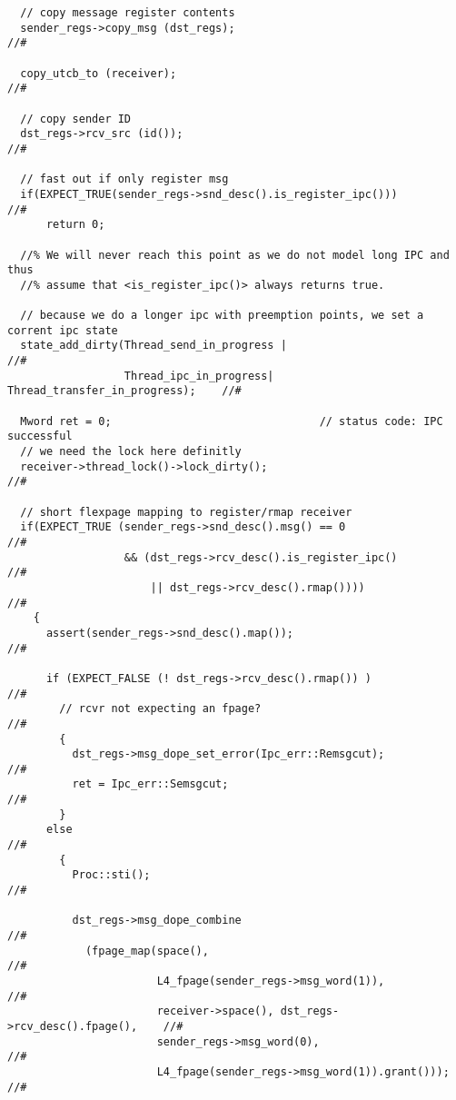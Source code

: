 \begin{lstlisting}
  // copy message register contents
  sender_regs->copy_msg (dst_regs);                                        //# 

  copy_utcb_to (receiver);                                                 //#

  // copy sender ID
  dst_regs->rcv_src (id());                                                //#

  // fast out if only register msg
  if(EXPECT_TRUE(sender_regs->snd_desc().is_register_ipc()))               //#   
      return 0;

  //% We will never reach this point as we do not model long IPC and thus
  //% assume that <is_register_ipc()> always returns true.

  // because we do a longer ipc with preemption points, we set a corrent ipc state
  state_add_dirty(Thread_send_in_progress |                                //#
                  Thread_ipc_in_progress| Thread_transfer_in_progress);    //#

  Mword ret = 0;                                // status code: IPC successful
  // we need the lock here definitly
  receiver->thread_lock()->lock_dirty();                                   //#

  // short flexpage mapping to register/rmap receiver
  if(EXPECT_TRUE (sender_regs->snd_desc().msg() == 0                       //#
                  && (dst_regs->rcv_desc().is_register_ipc()               //#
                      || dst_regs->rcv_desc().rmap())))                    //#
    {
      assert(sender_regs->snd_desc().map());                               //#

      if (EXPECT_FALSE (! dst_regs->rcv_desc().rmap()) )                   //#
        // rcvr not expecting an fpage?                                    //# 
        {
          dst_regs->msg_dope_set_error(Ipc_err::Remsgcut);                 //#
          ret = Ipc_err::Semsgcut;                                         //#
        }
      else                                                                 //#
        {
          Proc::sti();                                                     //#

          dst_regs->msg_dope_combine                                       //#
            (fpage_map(space(),                                            //#
                       L4_fpage(sender_regs->msg_word(1)),                 //#
                       receiver->space(), dst_regs->rcv_desc().fpage(),    //#
                       sender_regs->msg_word(0),                           //#
                       L4_fpage(sender_regs->msg_word(1)).grant()));       //#


\end{lstlisting}
